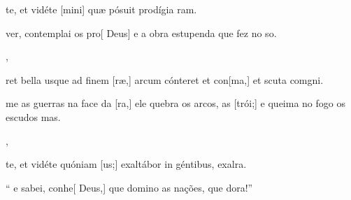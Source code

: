 {  {\item {}te, et vidéte [mini] quæ pósuit prodígia ram.}%
    {\item {} ver, contemplai os pro[ Deus] e a obra estupenda que fez no so.},
  {\item {}ret bella usque ad finem [ræ,] arcum cónteret et con[ma,] et scuta comgni.}%
    {\item {}me as guerras na face da [ra,] ele quebra os arcos, as [trói;] e queima no fogo os escudos mas.},
  {\item {}te, et vidéte quóniam [us;] exaltábor in géntibus, exalra.}%
    {\item {}`` e sabei, conhe[ Deus,] que domino as nações, que dora!''}
}